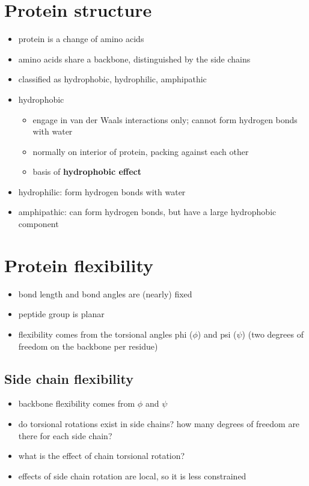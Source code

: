 \documentclass[10pt]{article}
\newenvironment{mitemize}
{
  \begin{itemize}
  \setlength{\itemsep}{1pt}
  \setlength{\parskip}{0pt}
  \setlength{\parsep}{0pt}}{\end{itemize}
}
\begin{document}
\section*{Protein structure}
  \begin{mitemize}
    \item protein is a change of amino acids
    \item amino acids share a backbone, distinguished by the side chains
    \item classified as hydrophobic, hydrophilic, amphipathic
    \item hydrophobic
    \begin{mitemize}
      \item engage in van der Waals interactions only; cannot form hydrogen bonds with water
      \item normally on interior of protein, packing against each other
      \item basis of \textbf{hydrophobic effect}
    \end{mitemize}
    \item hydrophilic: form hydrogen bonds with water
    \item amphipathic: can form hydrogen bonds, but have a large hydrophobic component
  \end{mitemize}

\section*{Protein flexibility}
  \begin{mitemize}
    \item bond length and bond angles are (nearly) fixed
    \item peptide group is planar
    \item flexibility comes from the torsional angles phi ($\phi$) and psi ($\psi$) (two degrees of freedom on the backbone per residue)
  \end{mitemize}
  \subsection*{Side chain flexibility}
    \begin{mitemize}
      \item backbone flexibility comes from $\phi$ and $\psi$
      \item do torsional rotations exist in side chains? how many degrees of freedom are there for each side chain?
      \item what is the effect of chain torsional rotation?
      \item effects of side chain rotation are local, so it is less constrained
    \end{mitemize}
\end{document}

